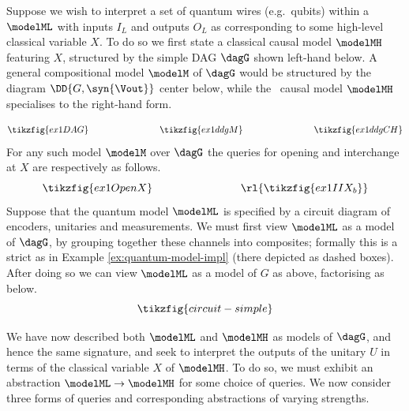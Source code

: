 \documentclass{article}
\begin{document}
\begin{example} \label{ex:PQD-DDG-ex-1}
Suppose we wish to interpret a set of quantum wires (e.g.~qubits) within a \qcircmodel{} $\modelML$ with inputs $I_L$ and outputs $O_L$ as corresponding to some high-level classical variable $X$. To do so we first state a classical causal model $\modelMH$ featuring $X$, structured by the simple DAG $\dagG$ shown left-hand below. A general compositional model $\modelM$ of $\dagG$ would be structured by the diagram $\DD{G,\syn{\Vout}}$ center below, while the \ causal model $\modelMH$ specialises to the right-hand form. 

\begin{equation}
\tikzfig{ex1DAG}
\qquad \qquad \qquad \qquad
\tikzfig{ex1ddgM}
\qquad \qquad \qquad \qquad
 \tikzfig{ex1ddgCH}
\end{equation}
For any such model $\modelM$ over $\dagG$ the queries for opening and interchange at $X$ are respectively as follows. 
\[
\tikzfig{ex1OpenX}
\qquad \qquad \qquad \qquad 
\rl{\tikzfig{ex1IIX_b}}
\]
Suppose that the quantum model $\modelML$ is specified by a circuit diagram of encoders, unitaries and measurements. We must first view $\modelML$ as a model of $\dagG$, by grouping together these channels into composites; formally this is a strict \strucdown{} as in Example \ref{ex:quantum-model-impl} (there depicted as dashed boxes). After doing so we can view $\modelML$ as a model of $G$ as above, factorising as below. 
\[
\tikzfig{circuit-simple}
\]

We have now described both $\modelML$ and $\modelMH$ as models of $\dagG$, and hence the same signature, and seek to interpret the outputs of the unitary $U$ in terms of the classical variable $X$ of $\modelMH$. To do so, we must exhibit an abstraction $\modelML \to \modelMH$ for some choice of queries. We now consider three forms of queries and corresponding abstractions of varying strengths.



\end{example}
\end{document}
